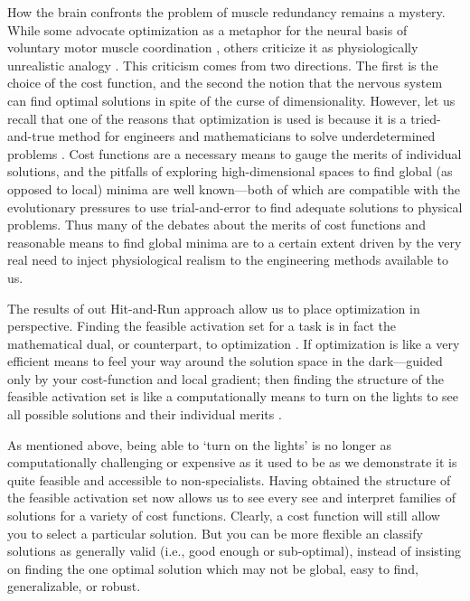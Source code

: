 How the brain confronts the problem of muscle redundancy remains a mystery. While some advocate optimization as a metaphor for the neural basis of voluntary motor muscle coordination  \cite{scott2004optimal,todorov2002optimal}, others criticize  it as physiologically unrealistic analogy \cite{deRugy2012habitual,loeb2012optimal}. This criticism comes from two directions. The first is the choice of the cost function, and the second the notion that the nervous system can find optimal solutions in spite of the curse of dimensionality. However, let us recall that one of the reasons that optimization is used is because it is a tried-and-true method for engineers and mathematicians to solve underdetermined problems \cite{valero-cuevas2009computational}.  Cost functions are  a necessary means to gauge the merits of individual solutions, and the pitfalls of exploring high-dimensional spaces to find global (as opposed to local) minima are well known---both of which are compatible with the evolutionary pressures to use trial-and-error to find adequate solutions to physical problems. Thus many of the debates about the merits of cost functions \cite{Prilutsky2000Muscle,crowninshield1981physiologically} and reasonable means to find  global minima \cite{shadmehr2012biological} are to a certain extent driven by the very real need to inject physiological realism to the engineering methods available to us.

The results of out Hit-and-Run approach allow us to place optimization in perspective. Finding the feasible activation set for a task is in fact the mathematical dual, or counterpart, to optimization \cite{deBerg2008computational,Chvatal1983Linear}. If optimization is like a very efficient means to feel your way around the solution space in the dark---guided only by your cost-function and local gradient; then  finding the structure of the feasible activation set is like a computationally means to turn on the lights to see all possible solutions and their individual merits \cite{valero-cuevas2015fundamentals}.

As mentioned above, being able to  `turn on the lights' is no longer as computationally challenging or expensive as it used to be as we demonstrate it is quite feasible and accessible to non-specialists. Having obtained the structure of the feasible activation set now allows us to see every see and interpret  families of solutions for a variety of cost functions. Clearly, a cost function will still allow you to select a particular solution. But you can  be more flexible an classify solutions as generally valid (i.e., good enough or sub-optimal),  instead of insisting on finding the one optimal solution which may not be global, easy to find, generalizable, or robust.

